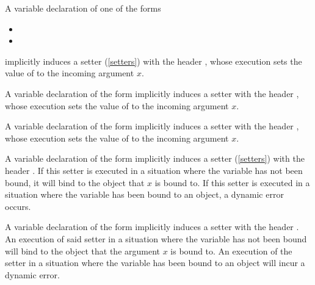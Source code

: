 \documentclass[makeidx]{article}
\begin{document}
\LMHash{}%
A variable declaration of one of the forms

\begin{itemize}
\item {}
\item {}
\end{itemize}

\noindent
implicitly induces a setter (\ref{setters}) with the header
,
whose execution sets the value of \id{} to the incoming argument $x$.

\LMHash{}%
A variable declaration of the form
implicitly induces a setter with the header
,
whose execution sets the value of \id{} to the incoming argument $x$.

\EndCase

\LMHash{}%
A variable declaration of the form
implicitly induces a setter with the header
,
whose execution sets the value of \id{} to the incoming argument $x$.

\EndCase

\LMHash{}%
A variable declaration of the form
implicitly induces a setter (\ref{setters}) with the header
.
If this setter is executed
in a situation where the variable \id{} has not been bound,
it will bind \id{} to the object that $x$ is bound to.
If this setter is executed
in a situation where the variable \id{} has been bound to an object,
a dynamic error occurs.
\EndCase

\LMHash{}%
A variable declaration of the form
implicitly induces a setter with the header
.
An execution of said setter
in a situation where the variable \id{} has not been bound
will bind \id{} to the object that the argument $x$ is bound to.
An execution of the setter
in a situation where the variable \id{} has been bound to an object
will incur a dynamic error.
\EndCase
\end{document}
